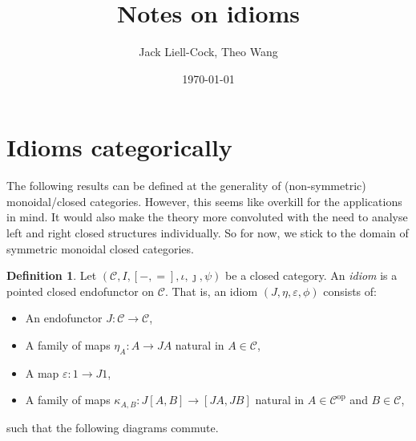 \documentclass{article}
\title{Notes on idioms}
\author{Jack Liell-Cock, Theo Wang}
\date{\today}
\theoremstyle{definition}
\newtheorem{defn}[thm]{Definition}
\theoremstyle{remark}
\newcommand{\op}{^{\mathrm{op}}}
\newcommand{\CCat}{\mathcal{C}}
\newcommand{\mult}{\phi}
\newcommand{\unit}{\eta}
\begin{document}
\maketitle

\section{Idioms categorically}

The following results can be defined at the generality of (non-symmetric) monoidal/closed categories. However, this seems like overkill for the applications in mind.
It would also make the theory more convoluted with the need to analyse left and right closed structures individually.
So for now, we stick to the domain of symmetric monoidal closed categories.

\begin{defn}
  Let $(\CCat, I, [{-}, {=}], \iota, \jmath, \psi)$ be a closed category. An \emph{idiom} is a pointed closed endofunctor on $\CCat$.
  That is, an idiom $(J, \unit, \varepsilon, \mult)$ consists of:
  \begin{itemize}
    \item An endofunctor $J: \CCat \to \CCat$,
    \item A family of maps $\unit_A: A \to JA$ natural in $A \in \CCat$,
    \item A map $\varepsilon: 1 \to J1$,
    \item A family of maps $\kappa_{A,B} : J[A,B] \to [JA,JB]$ natural in $A\in\CCat\op$ and $B \in \CCat$,
  \end{itemize}
  such that the following diagrams commute.
\end{defn}
\end{document}

